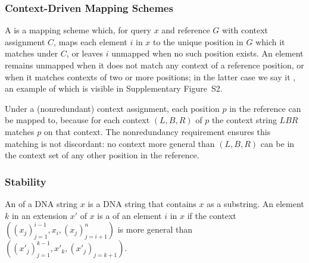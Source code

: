 
\subsubsection{Context-Driven Mapping Schemes}
\begin{sloppypar}
A  is a mapping scheme which, for query $x$ and reference $G$ with context assignment $C$, maps each element $i$ in $x$ to the unique position in $G$ which it matches under $C$, or leaves $i$ unmapped when no such position exists. An element remains unmapped when it does not match any context of a reference position, or when it matches contexts of two or more positions; in the latter case we say it , an example of which is visible in Supplementary Figure~S2.
\end{sloppypar}


Under a (nonredundant) context assignment, each position $p$ in the reference can be mapped to, because for each context $(L, B, R)$ of $p$ the context string $LBR$ matches $p$ on that context. The nonredundancy requirement ensures this matching is not discordant: no context more general than $(L, B, R)$ can be in the context set of any other position in the reference.

\subsubsection{Stability}
An  of a DNA string $x$ is a DNA string that contains $x$ as a substring.  
An element $k$ in an extension $x'$ of $x$ is a  of an element $i$ in $x$  if the context $((x_j)_{j=1}^{i-1}, x_i, (x_j)_{j=i+1}^n)$ is more general than $((x'_j)_{j=1}^{k-1}, x'_k, (x'_j)_{j=k+1})$.

